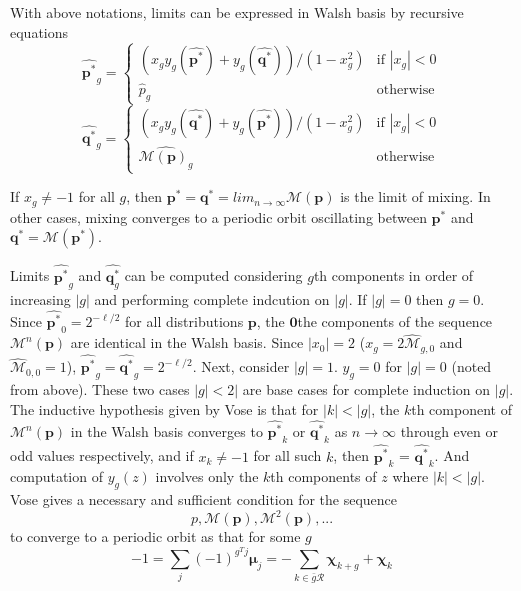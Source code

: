 With above notations, limits can be expressed in Walsh basis by recursive equations 
\begin{equation}
\label{lt1}
\widehat{{\bm p}^{\ast}}_g  = \begin{cases}
    (x_g y_g(\widehat{{\bm p}^{\ast}}) + y_g(\widehat{{\bm q}^{\ast}}))/(1-x_g^2)  & \text{if $|x_g| < 0$}\\
    \widehat{p}_g  & \text{otherwise}
  \end{cases}
\end{equation}
\begin{equation}
\label{lt2}
\widehat{{\bm q}^{\ast}}_g  = \begin{cases}
    (x_g y_g(\widehat{{\bm q}^{\ast}}) + y_g(\widehat{{\bm p}^{\ast}}))/(1-x_g^2)  & \text{if $|x_g| < 0$}\\
    \widehat{\mathcal{M}({\bm p})_g}  & \text{otherwise}
  \end{cases}
\end{equation}

If $x_g \neq −1$ for all $g$, then ${\bm p}^\ast = {\bm q}^\ast = lim_{n \rightarrow \infty} \mathcal{M}({\bm p})$ is the limit of mixing. In other cases, 
mixing converges to a periodic orbit oscillating between ${\bm p}^\ast$ and ${\bm q}^\ast = \mathcal{M}({\bm p}^\ast)$.

Limits $\widehat{{\bm p}^{\ast}}_g$ and $\widehat{{\bm q}^{\ast}_g}$ can be computed considering $g$th components in order of increasing $|g|$ and 
performing complete indcution on $|g|$. If $|g| = 0$ then $g = 0$. Since $\widehat{{\bm p}^\ast}_0 = 2^{-\ell/2}$ for all distributions ${\bm p}$, 
the $\textbf{0}$the components of the sequence $\mathcal{M}^n({\bm p})$ are identical in the Walsh basis. Since $|x_0| = 2$ ($x_g = 2\widehat{\mathcal{M}}_{g,0}$ 
and $\widehat{\mathcal{M}}_{0,0} = 1$), $\widehat{{\bm p}^{\ast}}_g = \widehat{{\bm q}^{\ast}}_g = 2^{-\ell/2}$. Next, consider $|g| = 1$. $y_g = 0$ for $|g| = 0$ 
(noted from above). These two cases $|g| < 2|$ are base cases for complete induction on $|g|$. The inductive hypothesis given by Vose is that 
for $|k| < |g|$, the $k$th component of $\mathcal{M}^n({\bm p})$ in the Walsh basis converges to $\widehat{{\bm p}^{\ast}}_k$ or $\widehat{{\bm q}^{\ast}}_k$ as 
$n \rightarrow \infty$ through even or odd values respectively, and if $x_k \neq -1$ for all such $k$, then 
$\widehat{{\bm p}^{\ast}}_k$ = $\widehat{{\bm q}^{\ast}}_k$. And computation of $y_g(z)$ involves only the $k$th components of $z$ where $|k| < |g|$. 
\newline 
Vose gives a necessary and sufficient condition for the sequence
\[
p, \mathcal{M}({\bm p}), \mathcal{M}^2({\bm p}),...
\]
to converge to a periodic orbit as that for some $g$
\begin{equation}
\label{OscCond}
-1 = \sum \limits_{j} (-1)^{g^T j} \bm{\mu}_j = - \sum \limits_{k \in \bar{g}\mathcal{R}} \bm{\chi}_{k+g} + \bm{\chi}_k
\end{equation}
 
